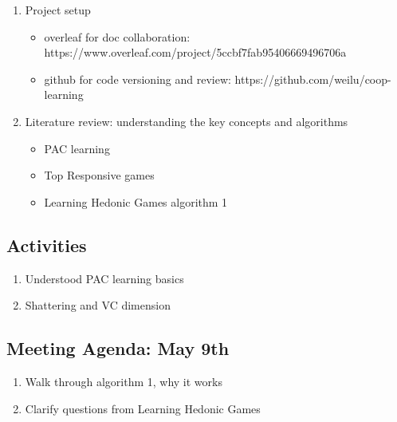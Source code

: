 \documentclass[a4paper]{article}
\begin{document}
\begin{enumerate}
  \item Project setup
  \begin{itemize}
    \item overleaf for doc collaboration: https://www.overleaf.com/project/5ccbf7fab95406669496706a
    \item github for code versioning and review: https://github.com/weilu/coop-learning
  \end{itemize}

  \item Literature review: understanding the key concepts and algorithms
  \begin{itemize}
    \item PAC learning
    \item Top Responsive games
    \item Learning Hedonic Games \cite{ijcai2017-380} algorithm 1
  \end{itemize}

\end{enumerate}

\subsection*{Activities}

\begin{enumerate}
  \item Understood PAC learning basics \cite{Valiant:1984:TL:1968.1972}
  \item Shattering and VC dimension \cite{vc}
\end{enumerate}

\subsection*{Meeting Agenda: May 9th}

\begin{enumerate}
  \item Walk through algorithm 1, why it works
  \item Clarify questions from Learning Hedonic Games \cite{ijcai2017-380}
\end{enumerate}

\end{document}
